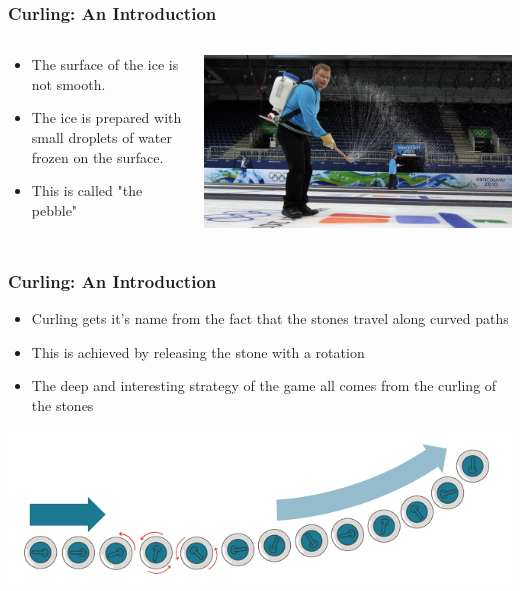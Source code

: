 \documentclass{beamer}
\begin{document}
\begin{frame}\frametitle{Curling: An Introduction}
    \begin{columns}    
        \begin{column}{0.3\textwidth}    
            \begin{itemize}
                \item The surface of the ice is not smooth.
                \item The ice is prepared with small droplets of water frozen on the surface.
                \item This is called "the pebble"
            \end{itemize}
        \end{column}
        \begin{column}{0.7\textwidth}    
            \centering
            \includegraphics[width=1.0\textwidth]{Images/Pebble.jpg}
        \end{column}
    \end{columns}    
\end{frame}

\begin{frame}\frametitle{Curling: An Introduction}
    \begin{itemize}
        \item Curling gets it's name from the fact that the stones travel along curved paths
        \item This is achieved by releasing the stone with a rotation
        \item The deep and interesting strategy of the game all comes from the curling of the stones
    \end{itemize}
    \centering
    \includegraphics[width=1.0\textwidth]{Images/Curl_Path.png}
\end{frame}
\end{document}
